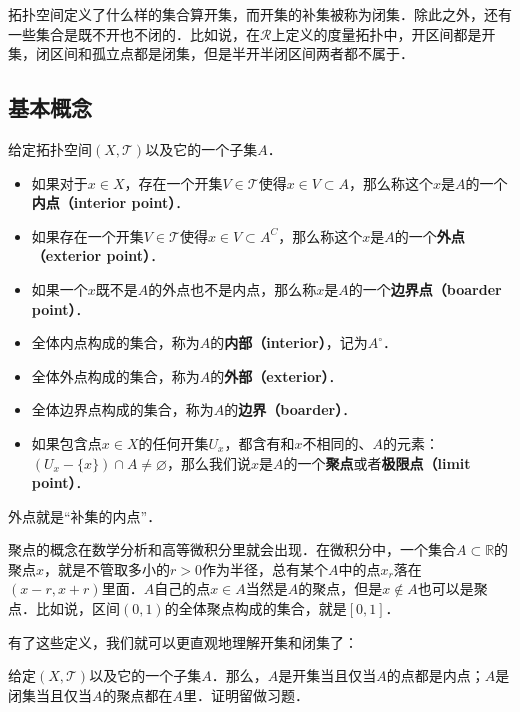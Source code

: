 拓扑空间定义了什么样的集合算开集，而开集的补集被称为闭集．除此之外，还有一些集合是既不开也不闭的．比如说，在$\mathcal{R}$上定义的度量拓扑中，开区间都是开集，闭区间和孤立点都是闭集，但是半开半闭区间两者都不属于．

\subsection{基本概念}
\begin{definition}{}
给定拓扑空间$(X, \mathcal{T})$以及它的一个子集$A$．
\begin{itemize}
\item 如果对于$x\in X$，存在一个开集$V\in \mathcal{T}$使得$x\in V\subset A$，那么称这个$x$是$A$的一个\textbf{内点（interior point）}．
\item 如果存在一个开集$V\in \mathcal{T}$使得$x\in V\subset A^C$，那么称这个$x$是$A$的一个\textbf{外点（exterior point）}．
\item 如果一个$x$既不是$A$的外点也不是内点，那么称$x$是$A$的一个\textbf{边界点（boarder point）}．

\item 全体内点构成的集合，称为$A$的\textbf{内部（interior）}，记为$A^\circ$．
\item 全体外点构成的集合，称为$A$的\textbf{外部（exterior）}．
\item 全体边界点构成的集合，称为$A$的\textbf{边界（boarder）}．
\item 如果包含点$x\in X$的任何开集$U_x$，都含有和$x$不相同的、$A$的元素：$(U_x-\{x\})\cap A\not=\varnothing$，那么我们说$x$是$A$的一个\textbf{聚点}或者\textbf{极限点（limit point）}．
\end{itemize}
\end{definition}

外点就是“补集的内点”．

聚点的概念在数学分析和高等微积分里就会出现．在微积分中，一个集合$A\subset\mathbb{R}$的聚点$x$，就是不管取多小的$r>0$作为半径，总有某个$A$中的点$x_r$落在$(x-r, x+r)$里面．$A$自己的点$x\in A$当然是$A$的聚点，但是$x\not\in A$也可以是聚点．比如说，区间$(0,1)$的全体聚点构成的集合，就是$[0,1]$．

有了这些定义，我们就可以更直观地理解开集和闭集了：

\begin{exercise}{}\label{Topo0_exe1}
给定$(X, \mathcal{T})$以及它的一个子集$A$．那么，$A$是开集当且仅当$A$的点都是内点；$A$是闭集当且仅当$A$的聚点都在$A$里．证明留做习题．
\end{exercise}

